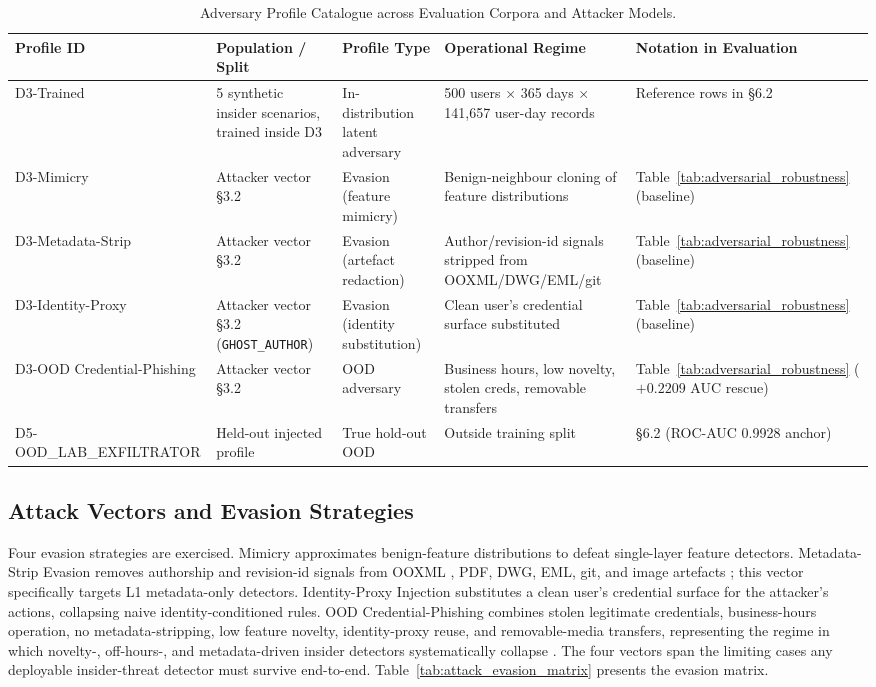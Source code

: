 \begin{table}[t!]
\caption{Adversary Profile Catalogue across Evaluation Corpora and Attacker Models.}
\label{tab:adversary_catalogue}
\centering
\footnotesize
\renewcommand{\arraystretch}{1.35}
\setlength{\tabcolsep}{6pt}
\begin{tabularx}{\textwidth}{l X X X X}
\toprule
\textbf{Profile ID} & \textbf{Population / Split} & \textbf{Profile Type} & \textbf{Operational Regime} & \textbf{Notation in Evaluation} \\
\midrule
D3-Trained & 5 synthetic insider scenarios, trained inside D3 & In-distribution latent adversary & 500 users $\times$ 365 days $\times$ 141,657 user-day records & Reference rows in \S6.2 \\
D3-Mimicry & Attacker vector \S3.2 & Evasion (feature mimicry) & Benign-neighbour cloning of feature distributions & Table~\ref{tab:adversarial_robustness} (baseline) \\
D3-Metadata-Strip & Attacker vector \S3.2 & Evasion (artefact redaction) & Author/revision-id signals stripped from OOXML/DWG/EML/git & Table~\ref{tab:adversarial_robustness} (baseline) \\
D3-Identity-Proxy & Attacker vector \S3.2 (\texttt{GHOST\_\allowbreak AUTHOR}) & Evasion (identity substitution) & Clean user's credential surface substituted & Table~\ref{tab:adversarial_robustness} (baseline) \\
D3-OOD Credential-Phishing & Attacker vector \S3.2 & OOD adversary & Business hours, low novelty, stolen creds, removable transfers & Table~\ref{tab:adversarial_robustness} ($+0.2209$ AUC rescue) \\
D5-OOD\_LAB\_EXFILTRATOR & Held-out injected profile & True hold-out OOD & Outside training split & \S6.2 (ROC-AUC 0.9928 anchor) \\
\bottomrule
\end{tabularx}
\end{table}

\subsection{Attack Vectors and Evasion Strategies}

Four evasion strategies are exercised. Mimicry approximates benign-feature distributions to defeat single-layer feature detectors. Metadata-Strip Evasion removes authorship and revision-id signals from OOXML \citep{didriksen2014ooxml, fu2015docx}, PDF, DWG, EML, git, and image artefacts \citep{umair2024exif2vec, yasenenko2025evaluating}; this vector specifically targets L1 metadata-only detectors. Identity-Proxy Injection substitutes a clean user's credential surface for the attacker's actions, collapsing naive identity-conditioned rules. OOD Credential-Phishing combines stolen legitimate credentials, business-hours operation, no metadata-stripping, low feature novelty, identity-proxy reuse, and removable-media transfers, representing the regime in which novelty-, off-hours-, and metadata-driven insider detectors systematically collapse \citep{ren2022cskg4apt, kurniawan2022krystal}. The four vectors span the limiting cases any deployable insider-threat detector must survive end-to-end. Table~\ref{tab:attack_evasion_matrix} presents the evasion matrix.

